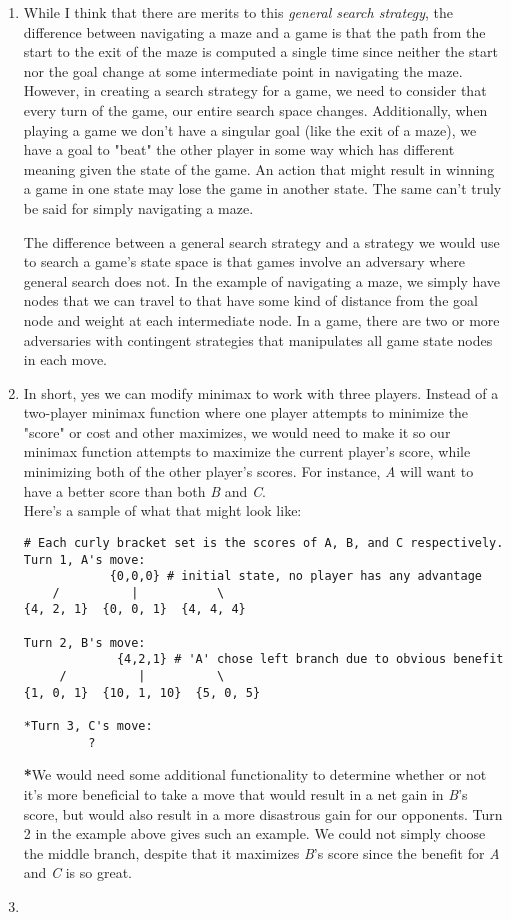 \documentclass{article}
\begin{document}
\begin{enumerate}
    \item %
    While I think that there are merits to this \textit{general search strategy}, the difference between navigating a maze and a game is that the path from the start to the exit of the maze is computed a single time since neither the start nor the goal change at some intermediate point in navigating the maze. However, in creating a search strategy for a game, we need to consider that every turn of the game, our entire search space changes. Additionally, when playing a game we don't have a singular goal (like the exit of a maze), we have a goal to "beat" the other player in some way which has different meaning given the state of the game. An action that might result in winning a game in one state may lose the game in another state. The same can't truly be said for simply navigating a maze.

    The difference between a general search strategy and a strategy we would use to search a game's state space is that games involve an adversary where general search does not. In the example of navigating a maze, we simply have nodes that we can travel to that have some kind of distance from the goal node and weight at each intermediate node. In a game, there are two or more adversaries with contingent strategies that manipulates all game state nodes in each move.

    \item
    In short, yes we can modify minimax to work with three players. Instead of a two-player minimax function where one player attempts to minimize the "score" or cost and other maximizes, we would need to make it so our minimax function attempts to maximize the current player's score, while minimizing both of the other player's scores. For instance, \textit{A} will want to have a better score than both \textit{B} and \textit{C}.
    \\Here's a sample of what that might look like:
\begin{verbatim}
# Each curly bracket set is the scores of A, B, and C respectively.
Turn 1, A's move:
            {0,0,0} # initial state, no player has any advantage
    /          |           \
{4, 2, 1}  {0, 0, 1}  {4, 4, 4}

Turn 2, B's move:
             {4,2,1} # 'A' chose left branch due to obvious benefit
     /          |          \
{1, 0, 1}  {10, 1, 10}  {5, 0, 5}

*Turn 3, C's move:
         ?
\end{verbatim}

    \textbf{*}We would need some additional functionality to determine whether or not it's more beneficial to take a move that would result in a net gain in \textit{B}'s score, but would also result in a more disastrous gain for our opponents. Turn 2 in the example above gives such an example. We could not simply choose the middle branch, despite that it maximizes \textit{B}'s score since the benefit for \textit{A} and \textit{C} is so great.

    \item


\end{enumerate}
\end{document}
